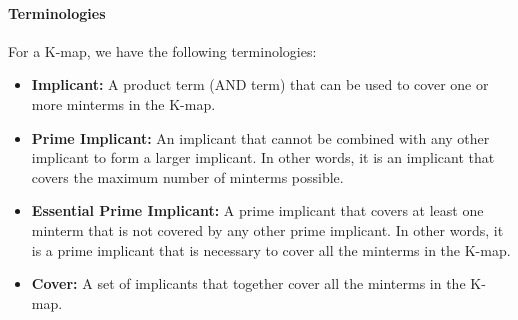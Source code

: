 \documentclass[11pt]{report}
\begin{document}
\paragraph{Terminologies} For a K-map, we have the following terminologies:
\begin{itemize}
    \item \textbf{Implicant:} A product term (AND term) that can be used to cover one or more minterms in the K-map.
    \item \textbf{Prime Implicant:} An implicant that cannot be combined with any other implicant to form a larger implicant. In other words, it is an implicant that covers the maximum number of minterms possible.
    \item \textbf{Essential Prime Implicant:} A prime implicant that covers at least one minterm that is not covered by any other prime implicant. In other words, it is a prime implicant that is necessary to cover all the minterms in the K-map.
    \item \textbf{Cover:} A set of implicants that together cover all the minterms in the K-map.
\end{itemize}
\end{document}
